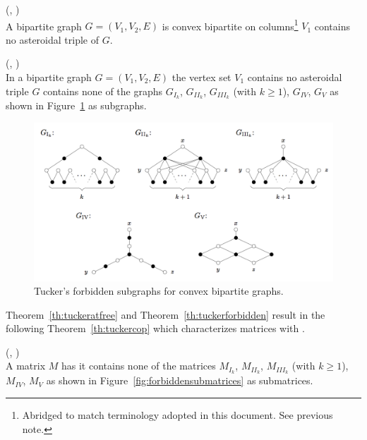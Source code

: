 \begin{theorem}
  (\cite[Th.~6]{at72}, \cite[Th.~2.3]{d08phd})\\
  A bipartite graph $G = (V_1, V_2, E)$ is convex bipartite on
  columns\footnote{Abridged to match terminology adopted in this
    document. See previous note.} \iff $V_1$ contains no asteroidal
  triple of $G$.
  \label{th:tuckeratfree}
\end{theorem}

\begin{theorem}
  (\cite[Th.~7]{at72}, \cite[Th.~2.4]{d08phd})\\
  In a bipartite graph $G = (V_1, V_2, E)$ the vertex set $V_1$
  contains no asteroidal triple \iff $G$ contains none of the graphs
  $G_{I_k}$, $G_{II_k}$, $G_{III_k}$ (with $k \ge 1$), $G_{IV}$,
  $G_{V}$ as shown in Figure~\ref{fig:forbiddensubgraphs} as subgraphs.
  \label{th:tuckerforbidden}
\end{theorem}


\begin{figure}[htbp]
  \centering
  \includegraphics[scale=0.35]{../img/tuckersforbiddensubgraphs.png}  
  \caption[\figtabsize Tucker's forbidden subgraphs]{\figtabsize Tucker's
    forbidden subgraphs for convex bipartite graphs. } 
  \label{fig:forbiddensubgraphs}
\end{figure}

Theorem~\ref{th:tuckeratfree} and Theorem~\ref{th:tuckerforbidden}
result in the following Theorem~\ref{th:tuckercop} which characterizes
matrices with \COP.

\begin{theorem}
  (\cite[Th.~9]{at72}, \cite[Th.~2.5]{d08phd})\\
  A matrix $M$ has \COP \iff it contains none of the matrices 
$M_{I_k}$, $M_{II_k}$, $M_{III_k}$ (with $k \ge 1$), $M_{IV}$,
  $M_{V}$ as shown in Figure~\ref{fig:forbiddensubmatrices} as submatrices.
  \label{th:tuckercop}
\end{theorem}

